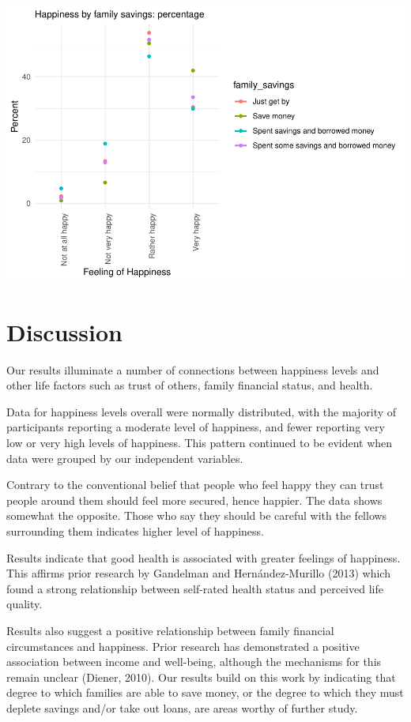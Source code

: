 \documentclass[man, fleqn, noextraspace,floatsintext]{apa6}
\begin{document}
\includegraphics{610_final_files/figure-latex/happiness by family savings tables and figures-1.pdf}

\hypertarget{discussion}{%
\section{Discussion}\label{discussion}}

Our results illuminate a number of connections between happiness levels and other life factors such as trust of others, family financial status, and health.

Data for happiness levels overall were normally distributed, with the majority of participants reporting a moderate level of happiness, and fewer reporting very low or very high levels of happiness. This pattern continued to be evident when data were grouped by our independent variables.

Contrary to the conventional belief that people who feel happy they can trust people around them should feel more secured, hence happier. The data shows somewhat the opposite. Those who say they should be careful with the fellows surrounding them indicates higher level of happiness.

Results indicate that good health is associated with greater feelings of happiness. This affirms prior research by Gandelman and Hernández-Murillo (2013) which found a strong relationship between self-rated health status and perceived life quality.

Results also suggest a positive relationship between family financial circumstances and happiness. Prior research has demonstrated a positive association between income and well-being, although the mechanisms for this remain unclear (Diener, 2010). Our results build on this work by indicating that degree to which families are able to save money, or the degree to which they must deplete savings and/or take out loans, are areas worthy of further study.
\end{document}
